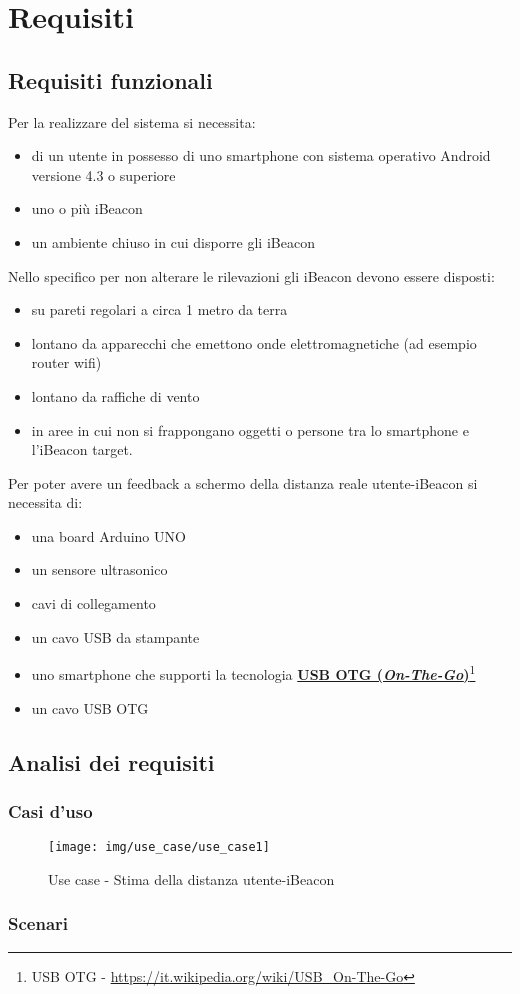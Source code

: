 \chapter{Requisiti}

\section{Requisiti funzionali}
Per la realizzare del sistema si necessita:
\begin{itemize}
	\item di un utente in possesso di uno smartphone con sistema operativo Android versione 4.3 o superiore
	\item uno o più iBeacon 
	\item un ambiente chiuso in cui disporre gli iBeacon
\end{itemize}
Nello specifico per non alterare le rilevazioni gli iBeacon devono essere disposti:
\begin{itemize}
	\item su pareti regolari a circa 1 metro da terra
	\item lontano da apparecchi che emettono onde elettromagnetiche (ad esempio router wifi) 
	\item lontano da raffiche di vento
	\item in aree in cui non si frappongano oggetti o persone tra lo smartphone e l'iBeacon target.
\end{itemize}
Per poter avere un feedback a schermo della distanza reale utente-iBeacon si necessita di:
\begin{itemize}
	\item una board Arduino UNO
	\item un sensore ultrasonico
	\item cavi di collegamento
	\item un cavo USB da stampante
	\item uno smartphone che supporti la tecnologia 
	\href{https://it.wikipedia.org/wiki/USB_On-The-Go}{\textbf{USB OTG (\textit{On-The-Go})}}\footnote{USB OTG - \url{https://it.wikipedia.org/wiki/USB_On-The-Go}}
	\item un cavo USB OTG
\end{itemize}


\section{Analisi dei requisiti}
\subsection{Casi d'uso}
\begin{figure}[ph]
	\centering
	\texttt{[image: img/use\_case/use\_case1]}
	\caption[Use case - Stima della distanza utente-iBeacon]{Use case - Stima della distanza utente-iBeacon}
	\label{fig:usecase}
\end{figure}

\subsection{Scenari}